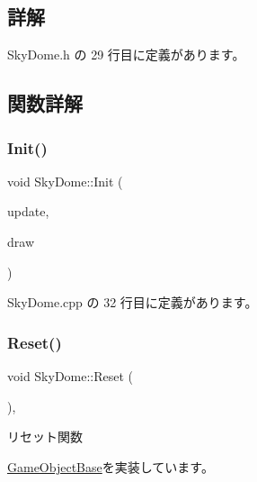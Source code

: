\subsection{詳解}


 Sky\+Dome.\+h の 29 行目に定義があります。



\subsection{関数詳解}
\mbox{\label{class_sky_dome_a948e0e90cea46c78053ac55610812d6c}} 
\subsubsection{\texorpdfstring{Init()}{Init()}}
{\footnotesize\ttfamily void Sky\+Dome\+::\+Init (\begin{DoxyParamCaption}\item[{\mbox{\hyperlink{class_update_base}{Update\+Base}} $\ast$}]{update,  }\item[{\mbox{\hyperlink{class_draw_base}{Draw\+Base}} $\ast$}]{draw }\end{DoxyParamCaption})}



 Sky\+Dome.\+cpp の 32 行目に定義があります。

\mbox{\label{class_sky_dome_abc6f8ed1471d7b03f25924a849cae590}} 
\subsubsection{\texorpdfstring{Reset()}{Reset()}}
{\footnotesize\ttfamily void Sky\+Dome\+::\+Reset (\begin{DoxyParamCaption}{ }\end{DoxyParamCaption})\hspace{0.3cm}{\ttfamily [override]}, {\ttfamily [virtual]}}



リセット関数 



\mbox{\hyperlink{class_game_object_base_a85c59554f734bcb09f1a1e18d9517dce}{Game\+Object\+Base}}を実装しています。




